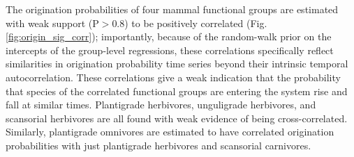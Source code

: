 \documentclass[12pt,letterpaper]{article}
\begin{document}
The origination probabilities of four mammal functional groups are estimated with weak support (P\(>\)0.8) to be positively correlated (Fig. \ref{fig:origin_sig_corr}); importantly, because of the random-walk prior on the intercepts of the group-level regressions, these correlations specifically reflect similarities in origination probability time series beyond their intrinsic temporal autocorrelation. These correlations give a weak indication that the probability that species of the correlated functional groups are entering the system rise and fall at similar times. Plantigrade herbivores, unguligrade herbivores, and scansorial herbivores are all found with weak evidence of being cross-correlated. Similarly, plantigrade omnivores are estimated to have correlated origination probabilities with just plantigrade herbivores and scansorial carnivores. 
%
\end{document}
